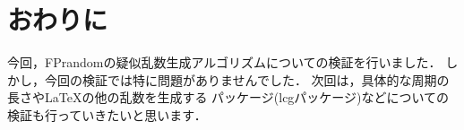 \section{おわりに}
今回，FPrandomの疑似乱数生成アルゴリズムについての検証を行いました．
しかし，今回の検証では特に問題がありませんでした．
次回は，具体的な周期の長さや\LaTeX の他の乱数を生成する
パッケージ(lcgパッケージ)などについての検証も行っていきたいと思います．
